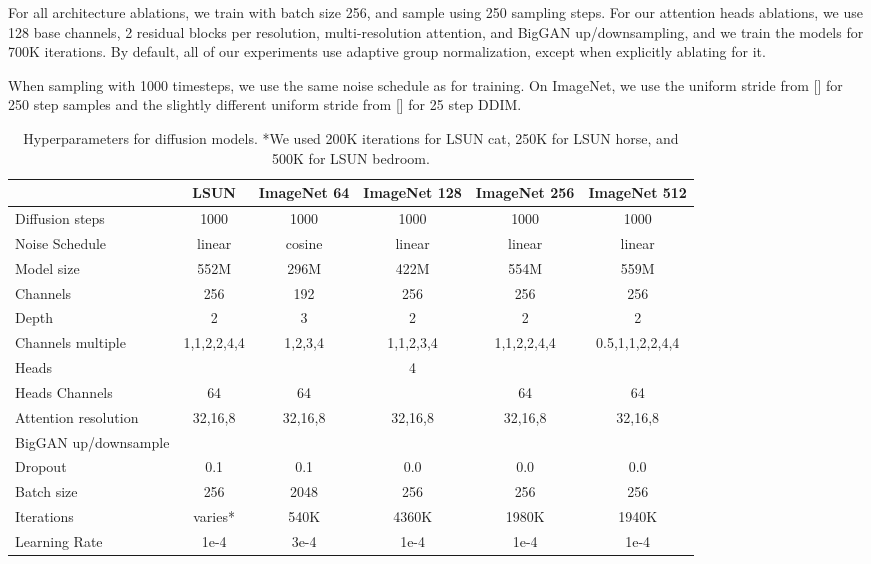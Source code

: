 \documentclass{article}
\newcommand{\cmark}{\ding{51}}%
\newcommand{\namecite}[1]{\citeauthor{#1} [\citenum{#1}]}
\begin{document}
For all architecture ablations, we train with batch size 256, and sample using 250 sampling steps. For our attention heads ablations, we use 128 base channels, 2 residual blocks per resolution, multi-resolution attention, and BigGAN up/downsampling, and we train the models for 700K iterations. By default, all of our experiments use adaptive group normalization, except when explicitly ablating for it.

When sampling with 1000 timesteps, we use the same noise schedule as for training. On ImageNet, we use the uniform stride from \namecite{improved} for 250 step samples and the slightly different uniform stride from \namecite{ddim} for 25 step DDIM.

\begin{table}[h]
    \setlength\tabcolsep{4pt}
    \begin{center}
    \begin{small}
    \begin{tabular}{lccccc}
    \toprule
     & LSUN & ImageNet 64 & ImageNet 128 & ImageNet 256 & ImageNet 512\\
    \midrule
    Diffusion steps & 1000 & 1000 & 1000 & 1000 & 1000 \\
    Noise Schedule & linear & cosine & linear & linear & linear \\
    Model size & 552M & 296M & 422M & 554M & 559M \\
    Channels & 256 & 192 & 256 & 256 & 256  \\
    Depth & 2 & 3 & 2 & 2 & 2 \\
    Channels multiple & 1,1,2,2,4,4 & 1,2,3,4 & 1,1,2,3,4 & 1,1,2,2,4,4 & 0.5,1,1,2,2,4,4 \\
    Heads & & & 4 & & \\
    Heads Channels & 64 & 64 & & 64 & 64 \\
    Attention resolution & 32,16,8 & 32,16,8 & 32,16,8 & 32,16,8 & 32,16,8 \\
    BigGAN up/downsample & \cmark & \cmark & \cmark & \cmark & \cmark \\
    Dropout & 0.1 & 0.1 & 0.0 & 0.0 & 0.0 \\
    Batch size & 256 & 2048 & 256 & 256 & 256 \\
    Iterations & varies* & 540K & 4360K & 1980K & 1940K \\
    Learning Rate & 1e-4 & 3e-4 & 1e-4 & 1e-4 & 1e-4 \\
    \bottomrule
    \end{tabular}
    \end{small}
    \end{center}
    \caption{Hyperparameters for diffusion models. *We used 200K iterations for LSUN cat, 250K for LSUN horse, and 500K for LSUN bedroom.}
    \label{tab:hpsdiff}
     \vskip -0.2in
\end{table}
\end{document}
